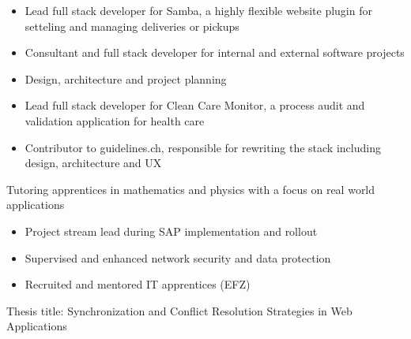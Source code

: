 \documentclass[10pt,a4paper]{altacv}
\begin{document}

\begin{fullwidth}
\makecvheader
\end{fullwidth}


\begin{itemize}
\item Lead full stack developer for Samba, a highly flexible website plugin for setteling and managing deliveries or pickups
\item Consultant and full stack developer for internal and external software projects
\end{itemize}
\divider

\begin{itemize}
\item Design, architecture and project planning
\item Lead full stack developer for Clean Care Monitor, a process audit and validation application for health care
\item Contributor to guidelines.ch, responsible for rewriting the stack including design, architecture and UX
\end{itemize}
\divider

Tutoring apprentices in mathematics and physics with a focus on real world applications
\divider

\begin{itemize}
\item Project stream lead during SAP implementation and rollout
\item Supervised and enhanced network security and data protection
\item Recruited and mentored IT apprentices (EFZ)
\end{itemize}
\divider


Thesis title: Synchronization and Conflict Resolution Strategies in Web Applications
\divider

\end{document}

